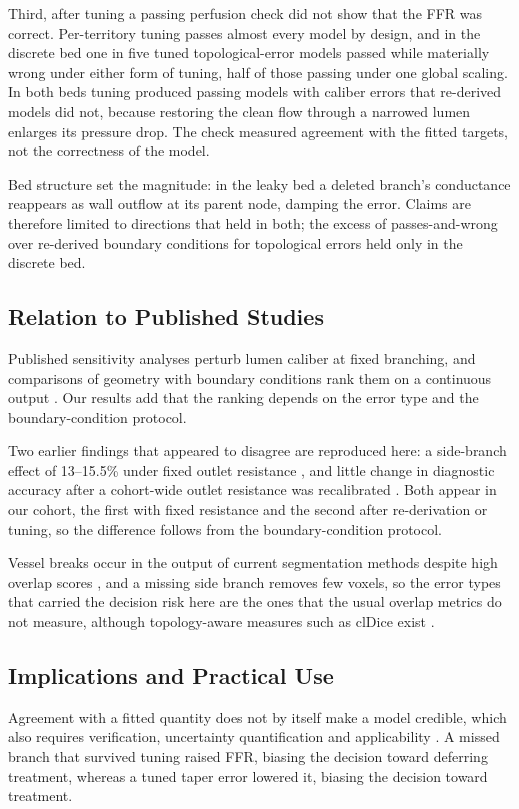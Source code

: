 \documentclass[journal]{IEEEtran}
\begin{document}
Third, after tuning a passing perfusion check did not show that the FFR was correct. Per-territory tuning passes
almost every model by design, and in the discrete bed one in five tuned topological-error models passed while
materially wrong under either form of tuning, half of those passing under one global scaling. In both beds tuning produced passing models with
caliber errors that re-derived models did not, because restoring the clean flow through a narrowed lumen enlarges
its pressure drop. The check measured agreement with the fitted targets, not the correctness of the model.

Bed structure set the magnitude: in the leaky bed a deleted branch's conductance reappears as wall outflow at its
parent node, damping the error. Claims are therefore limited to directions that held in both; the
excess of passes-and-wrong over re-derived boundary conditions for topological errors held only in the discrete bed.

\subsection{Relation to Published Studies}
Published sensitivity analyses perturb lumen caliber at fixed branching, and comparisons of geometry with boundary
conditions rank them on a continuous output \cite{sankaran2016,tanade2022,korte2023}. Our results add that the
ranking depends on the error type and the boundary-condition protocol.

Two earlier findings that appeared to disagree are reproduced here: a side-branch effect of 13--15.5\% under fixed
outlet resistance \cite{gamage2022}, and little change in diagnostic accuracy after a cohort-wide outlet resistance
was recalibrated \cite{gosling2020}. Both appear in our cohort, the first with fixed resistance and the second after re-derivation or tuning, so the difference follows
from the boundary-condition protocol.

Vessel breaks occur in the output of current segmentation methods despite high overlap scores \cite{bransby2026},
and a missing side branch removes few voxels, so the error types that carried the decision risk here are the ones that the usual overlap metrics do not measure, although topology-aware measures such as clDice
exist \cite{shit2021}.

\subsection{Implications and Practical Use}
Agreement with a fitted quantity does not by itself make a model credible, which also requires verification,
uncertainty quantification and applicability \cite{viceconti2025}. A missed branch that survived tuning raised FFR, biasing the decision toward
deferring treatment, whereas a tuned taper error lowered it, biasing the decision toward treatment.
\end{document}
